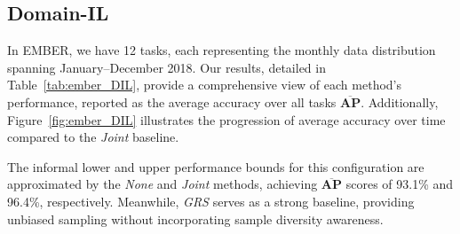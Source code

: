 

\subsection{Domain-IL}
\label{domainilexps}




In EMBER, we have 12 tasks, each representing the monthly data distribution spanning January--December 2018. Our results, detailed in Table~\ref{tab:ember_DIL}, provide a comprehensive view of each method's performance, reported as the average accuracy over all tasks $\mathbf{\overline{AP}}$. Additionally, Figure~\ref{fig:ember_DIL} illustrates the progression of average accuracy over time compared to the \textit{Joint} baseline. 

The informal lower and upper performance bounds for this configuration are approximated by the \textit{None} and \textit{Joint} methods, achieving $\mathbf{\overline{AP}}$ scores of 93.1\% and 96.4\%, respectively. Meanwhile, \textit{GRS} serves as a strong baseline, providing unbiased sampling without incorporating sample diversity awareness.


